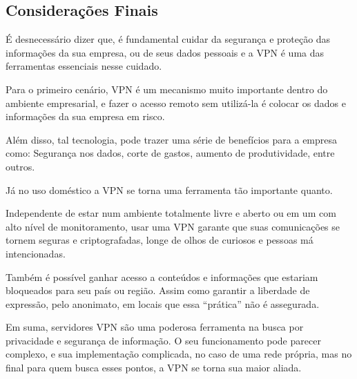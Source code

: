 \documentclass[12pt]{article}
\begin{document}
\begin{flushleft}
\section{Considerações Finais}

É desnecessário dizer que, é fundamental cuidar da segurança e proteção das informações da sua empresa, ou de seus dados pessoais e a VPN é uma das ferramentas essenciais nesse cuidado.

Para o primeiro cenário, VPN é um mecanismo muito importante dentro do ambiente empresarial, e fazer o acesso remoto sem utilizá-la é colocar os dados e informações da sua empresa em risco.

Além disso, tal tecnologia, pode trazer uma série de benefícios para a empresa como: Segurança nos dados, corte de gastos, aumento de produtividade, entre outros.

Já no uso doméstico a VPN se torna uma ferramenta tão importante quanto. 

Independente de estar num ambiente totalmente livre e aberto ou em um com alto nível de monitoramento, usar uma VPN garante que suas comunicações se tornem seguras e criptografadas, longe de olhos de curiosos e pessoas má intencionadas.

Também é possível ganhar acesso a conteúdos e informações que estariam bloqueados para seu país ou região. Assim como garantir a liberdade de expressão, pelo anonimato, em locais que essa “prática” não é assegurada. 

Em suma, servidores VPN são uma poderosa ferramenta na busca por privacidade e segurança de informação. O seu funcionamento pode parecer complexo, e sua implementação complicada, no caso de uma rede própria, mas no final para quem busca esses pontos, a VPN se torna sua maior aliada.






\cite{hostone:100}
\cite{stackexchange:101}
\cite{compugraf:103}
\cite{starti:104}

\end{flushleft}
\end{document}

